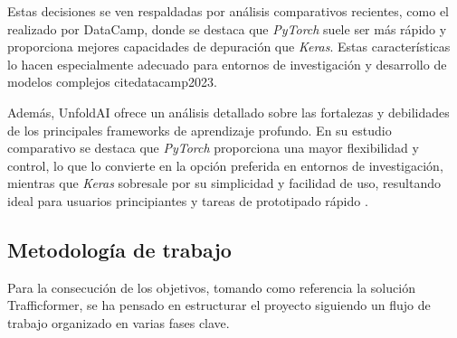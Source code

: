 Estas decisiones se ven respaldadas por análisis comparativos recientes, como el realizado por DataCamp, donde se destaca que \textit{PyTorch} suele ser más rápido y proporciona mejores capacidades de depuración que \textit{Keras}. Estas características lo hacen especialmente adecuado para entornos de investigación y desarrollo de modelos complejos cite{datacamp2023}.

Además, UnfoldAI ofrece un análisis detallado sobre las fortalezas y debilidades de los principales frameworks de aprendizaje profundo. En su estudio comparativo se destaca que \textit{PyTorch} proporciona una mayor flexibilidad y control, lo que lo convierte en la opción preferida en entornos de investigación, mientras que \textit{Keras} sobresale por su simplicidad y facilidad de uso, resultando ideal para usuarios principiantes y tareas de prototipado rápido \cite{unfoldai2024}.

\subsection{Metodología de trabajo}

Para la consecución de los objetivos, tomando como referencia la solución Trafficformer, se ha pensado en estructurar el proyecto siguiendo un flujo de trabajo organizado en varias fases clave.


